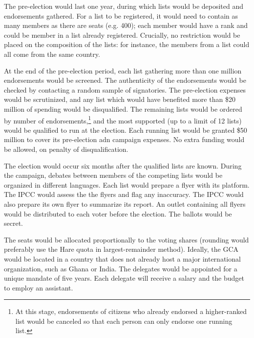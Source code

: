 \documentclass[12pt,english]{article}
\begin{document}
The pre-election would last one year, during which lists would be deposited and endorsements gathered. For a list to be registered, it would need to contain as many members as there are seats (e.g. 400); each member would have a rank and could be member in a list already registered. Crucially, no restriction would be placed on the composition of the lists: for instance, the members from a list could all come from the same country. %

At the end of the pre-election period, each list gathering more than one million endorsements would be screened. The authenticity of the endorsements would be checked by contacting a random sample of signatories. The pre-election expenses would be scrutinized, and any list which would have benefited more than \$20 million of spending would be disqualified. The remaining lists would be ordered by number of endorsements,\footnote{At this stage, endorsements of citizens who already endorsed a higher-ranked list would be canceled so that each person can only endorse one running list.
} and the most supported (up to a limit of 12 lists) would be qualified to run at the election. Each running list would be granted \$50 million to cover its pre-election adn campaign expenses. No extra funding would be allowed, on penalty of disqualification.

The election would occur six months after the qualified lists are known. During the campaign, debates between members of the competing lists would be organized in different languages. Each list would prepare a flyer with its platform. The IPCC would assess the the flyers and flag any inaccuracy. The IPCC would also prepare its own flyer to summarize its report. An outlet containing all flyers would be distributed to each voter before the election. The ballots would be secret. 

The seats would be allocated proportionally to the voting shares (rounding would preferably use the Hare quota in largest-remainder method). Ideally, the GCA would be located in a country that does not already host a major international organization, such as Ghana or India. The delegates would be appointed for a unique mandate of five years. Each delegate will receive a salary and the budget to employ an assistant. 
\end{document}
